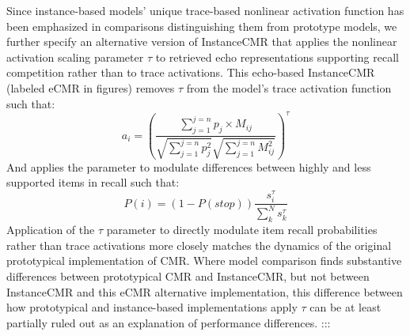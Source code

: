 {}Since instance-based models' unique trace-based nonlinear activation function has been emphasized in comparisons distinguishing them from prototype models, we further specify an alternative version of InstanceCMR that applies the nonlinear activation scaling parameter $\tau$ to retrieved echo representations supporting recall competition rather than to trace activations. This echo-based InstanceCMR (labeled eCMR in figures) removes $\tau$ from the model's trace activation function such that:\markdownRendererInterblockSeparator
{}$$a_i = \left({\frac {\sum^{j=n}_{j=1}{p_j \times M_{ij}}} {\sqrt{\sum^{j=n}_{j=1}{p^2_j}} \sqrt{\sum^{j=n}_{j=1}{M^2_{ij}}}}}\right)^{\tau}$$\markdownRendererInterblockSeparator
{}And applies the parameter to modulate differences between highly and less supported items in recall such that:\markdownRendererInterblockSeparator
{}$$P(i) = (1-P(stop))\frac{s^{\tau}_i}{\sum_{k}^{N}s^{\tau}_k}$$\markdownRendererInterblockSeparator
{}Application of the $\tau$ parameter to directly modulate item recall probabilities rather than trace activations more closely matches the dynamics of the original prototypical implementation of CMR. Where model comparison finds substantive differences between prototypical CMR and InstanceCMR, but not between InstanceCMR and this eCMR alternative implementation, this difference between how prototypical and instance-based implementations apply $\tau$ can be at least partially ruled out as an explanation of performance differences. :::\relax